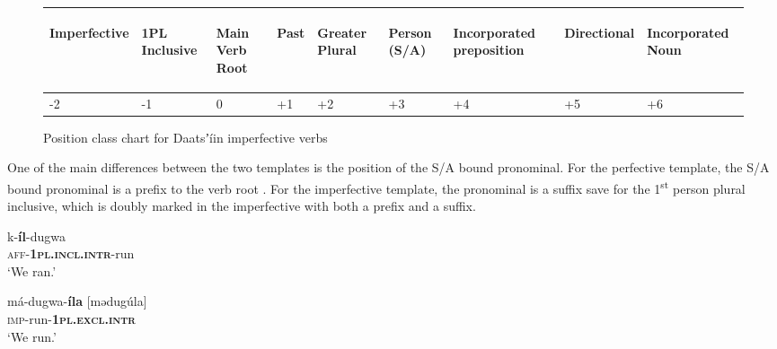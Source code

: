 \documentclass[output=paper]{langsci/langscibook}
\begin{document}
\begin{figure}
\begin{tabularx}{\textwidth}{XXXXXXXXp{3cm}}
\begin{turn}{33} Imperfective \end{turn} & \begin{turn}{33} 1PL Inclusive \end{turn} & \begin{turn}{33} Main Verb Root \end{turn} & \begin{turn}{33} Past \end{turn} & \begin{turn}{33} Greater Plural \end{turn} & \begin{turn}{33} Person (S/A) \end{turn} & \begin{turn}{33} Incorporated preposition \end{turn} & \begin{turn}{33} Directional \end{turn} & \begin{turn}{33} Incorporated Noun \end{turn} \\ \midrule
\multicolumn{1}{X}{{}-2} & \multicolumn{1}{X}{{}-1} & \multicolumn{1}{X}{0} & \multicolumn{1}{X}{+1} & \multicolumn{1}{X}{+2} & \multicolumn{1}{X}{+3} & \multicolumn{1}{X}{+4} & \multicolumn{1}{X}{+5} & +6\\
\end{tabularx}
\caption{Position class chart for Daatsʼíin imperfective verbs}
\label{fig:ahlandc:3}
\end{figure}

One of the main differences between the two templates is the position of the S/A bound pronominal. For the perfective template, the S/A bound pronominal is a prefix to the verb root . For the imperfective template, the pronominal is a suffix  save for the 1\textsuperscript{st} person plural inclusive, which is doubly marked in the imperfective with both a prefix and a suffix. 

\ea\label{ex:ahlandc:6}
\gll 
k-\textbf{íl}{}-dugwa \\
\textsc{aff}{}-\textbf{\textsc{1pl.incl.intr}}{}-run \\
\glt
‘We ran.’
\z

\ea\label{ex:ahlandc:7}
\gll 
má-dugwa-\textbf{íla}   [mədug\'{u}la] \\
\textsc{imp}{}-run-\textbf{\textsc{1pl.excl.intr}} \\
\glt 
 ‘We run.’
\z
\end{document}
